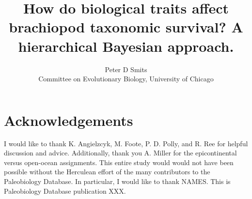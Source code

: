 \documentclass{article}
\title{How do biological traits affect brachiopod taxonomic survival? A hierarchical Bayesian approach.}
\author{Peter D Smits\\Committee on Evolutionary Biology, University of Chicago}
\begin{document}
\maketitle











\section*{Acknowledgements}
I would like to thank K. Angielzcyk, M. Foote, P. D. Polly, and R. Ree for helpful discussion and advice. Additionally, thank you A. Miller for the epicontinental versus open-ocean assignments. This entire study would would not have been possible without the Herculean effort of the many contributors to the Paleobiology Database. In particular, I would like to thank NAMES. This is Paleobiology Database publication XXX.

\clearpage




\clearpage

\appendix

\end{document}
